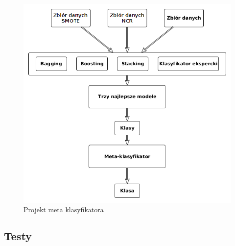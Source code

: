 \begin{figure}[H]
	\centering
	\includegraphics[width=\textwidth]{./images/metaklas.png}
	\caption{Projekt meta klasyfikatora}
	\label{fig:metaklasmoj}
\end{figure}
\subsection{Testy}